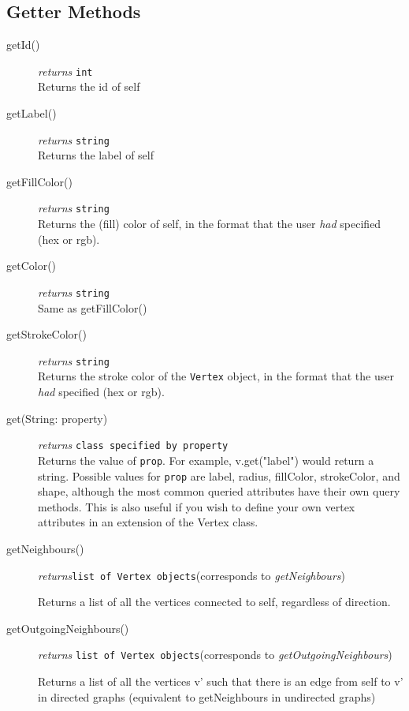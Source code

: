 \subsection{Getter Methods}
\begin{description}
\item[getId()] \emph{returns} \texttt{int}\\
Returns the id of self

\item[getLabel()] \emph{returns} \texttt{string}\\
Returns the label of self

\item[getFillColor()] \emph{returns} \texttt{string}\\
Returns the (fill) color of self, in the format that the user \textit{had} specified (hex or rgb).

\item[getColor()] \emph{returns} \texttt{string}\\
Same as getFillColor()

\item[getStrokeColor()] \emph{returns} \texttt{string}\\
Returns the stroke color of the \texttt{Vertex} object, in the format that the user \textit{had} specified (hex or rgb).

\item[get(String: property)] \emph{returns} \texttt{class specified by property}\\
Returns the value of \texttt{prop}. For example, v.get("label") would return a string. Possible values for \texttt{prop} are label, radius, fillColor, strokeColor, and shape, although the most common queried attributes have their own query methods. This is also useful if you wish to define your own vertex attributes in an extension of the Vertex class.

\label{getNeighboursClass}\item[getNeighbours()]\emph{returns}\texttt{list of Vertex objects}\quad(corresponds to \textit{getNeighbours})


Returns a list of all the vertices connected to self, regardless of direction.

\label{getOutgoingNeighboursClass}\item[getOutgoingNeighbours()]\emph{returns} \texttt{list of Vertex objects}\quad(corresponds to \textit{getOutgoingNeighbours})

Returns a list of all the vertices v' such that there is an edge from self to v' in directed graphs (equivalent to getNeighbours in undirected graphs)


\end{description}
